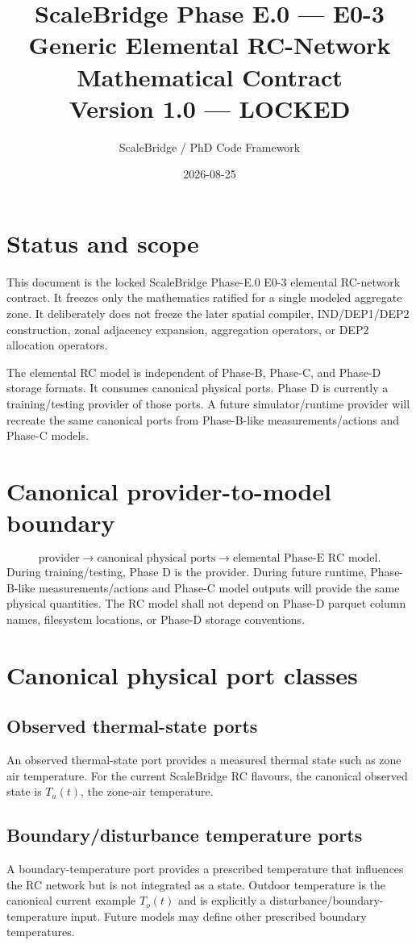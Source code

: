 \documentclass[11pt]{article}
\title{ScaleBridge Phase E.0 --- E0-3\\Generic Elemental RC-Network Mathematical Contract\\\large Version 1.0 --- LOCKED}
\author{ScaleBridge / PhD Code Framework}
\date{2026-08-25}
\begin{document}
\maketitle
\section*{Status and scope}
This document is the locked ScaleBridge Phase-E.0 E0-3 elemental RC-network contract. It freezes only the mathematics ratified for a single modeled aggregate zone. It deliberately does not freeze the later spatial compiler, IND/DEP1/DEP2 construction, zonal adjacency expansion, aggregation operators, or DEP2 allocation operators.

The elemental RC model is independent of Phase-B, Phase-C, and Phase-D storage formats. It consumes canonical physical ports. Phase D is currently a training/testing provider of those ports. A future simulator/runtime provider will recreate the same canonical ports from Phase-B-like measurements/actions and Phase-C models.

\section{Canonical provider-to-model boundary}
\[
\boxed{\text{provider}\longrightarrow\text{canonical physical ports}\longrightarrow\text{elemental Phase-E RC model}.}
\]
During training/testing, Phase D is the provider. During future runtime, Phase-B-like measurements/actions and Phase-C model outputs will provide the same physical quantities. The RC model shall not depend on Phase-D parquet column names, filesystem locations, or Phase-D storage conventions.

\section{Canonical physical port classes}
\subsection{Observed thermal-state ports}
An observed thermal-state port provides a measured thermal state such as zone air temperature. For the current ScaleBridge RC flavours, the canonical observed state is $T_a(t)$, the zone-air temperature.

\subsection{Boundary/disturbance temperature ports}
A boundary-temperature port provides a prescribed temperature that influences the RC network but is not integrated as a state. Outdoor temperature is the canonical current example $T_o(t)$ and is explicitly a disturbance/boundary-temperature input. Future models may define other prescribed boundary temperatures.
\end{document}
